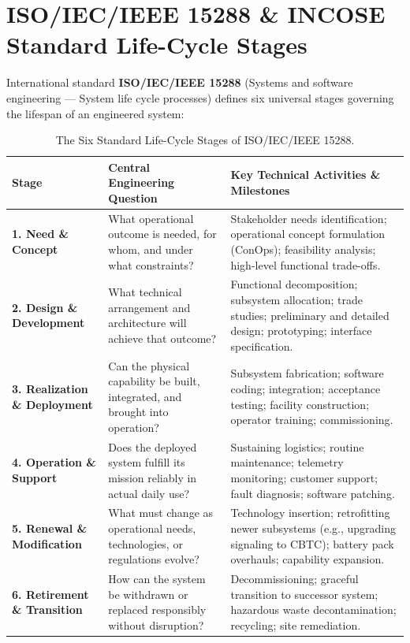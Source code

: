 \section{ISO/IEC/IEEE 15288 \& INCOSE Standard Life-Cycle Stages}
\label{sec:iso_incose_stages}

International standard \textbf{ISO/IEC/IEEE 15288} (Systems and software engineering --- System life cycle processes) defines six universal stages governing the lifespan of an engineered system:

\begin{table}[htbp]
\centering
\small
\renewcommand{\arraystretch}{1.3}
\begin{tabularx}{\textwidth}{lp{4cm}X}
\toprule
\textbf{Stage} & \textbf{Central Engineering Question} & \textbf{Key Technical Activities \& Milestones} \\
\midrule
\textbf{1. Need \& Concept} & What operational outcome is needed, for whom, and under what constraints? & Stakeholder needs identification; operational concept formulation (ConOps); feasibility analysis; high-level functional trade-offs. \\
\textbf{2. Design \& Development} & What technical arrangement and architecture will achieve that outcome? & Functional decomposition; subsystem allocation; trade studies; preliminary and detailed design; prototyping; interface specification. \\
\textbf{3. Realization \& Deployment} & Can the physical capability be built, integrated, and brought into operation? & Subsystem fabrication; software coding; integration; acceptance testing; facility construction; operator training; commissioning. \\
\textbf{4. Operation \& Support} & Does the deployed system fulfill its mission reliably in actual daily use? & Sustaining logistics; routine maintenance; telemetry monitoring; customer support; fault diagnosis; software patching. \\
\textbf{5. Renewal \& Modification} & What must change as operational needs, technologies, or regulations evolve? & Technology insertion; retrofitting newer subsystems (e.g., upgrading signaling to CBTC); battery pack overhauls; capability expansion. \\
\textbf{6. Retirement \& Transition} & How can the system be withdrawn or replaced responsibly without disruption? & Decommissioning; graceful transition to successor system; hazardous waste decontamination; recycling; site remediation. \\
\bottomrule
\end{tabularx}
\caption{The Six Standard Life-Cycle Stages of ISO/IEC/IEEE 15288.}
\label{tab:iso_stages}
\end{table}


